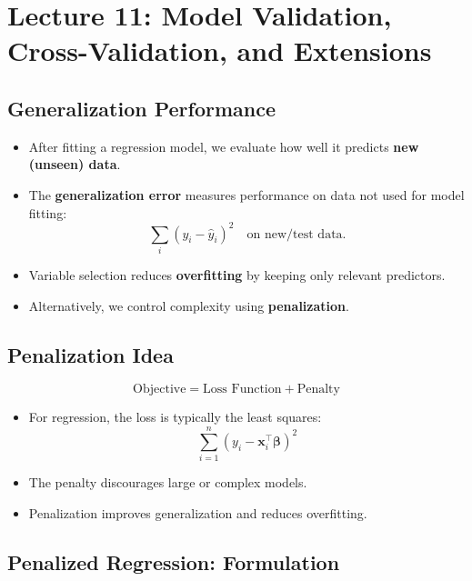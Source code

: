 \section{Lecture 11: Model Validation, Cross-Validation, and Extensions}

\subsection{Generalization Performance}

\begin{itemize}
\item After fitting a regression model, we evaluate how well it predicts \textbf{new (unseen) data}.

\item The \textbf{generalization error} measures performance on data not used for model fitting:
\[
\sum_{i} (y_i - \hat{y}_i)^2 \quad \text{on new/test data.}
\]

\item Variable selection reduces \textbf{overfitting} by keeping only relevant predictors.

\item Alternatively, we control complexity using \textbf{penalization}.
\end{itemize}

\subsection{Penalization Idea}

\begin{keyresult}
\[
\text{Objective} = \text{Loss Function} + \text{Penalty}
\]

\begin{itemize}
\item For regression, the loss is typically the least squares:
\[
\sum_{i=1}^{n} (y_i - \mathbf{x}_i^\top \boldsymbol{\beta})^2
\]

\item The penalty discourages large or complex models.

\item Penalization improves generalization and reduces overfitting.
\end{itemize}
\end{keyresult}

\subsection{Penalized Regression: Formulation}

